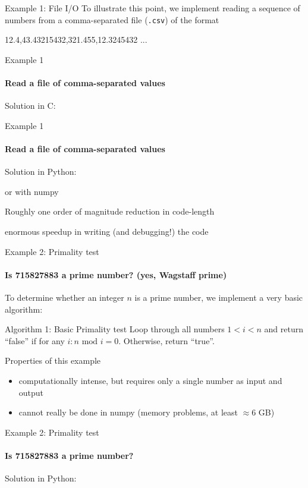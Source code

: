 \documentclass[german]{beamer}
\newcommand{\ra}{\text{$\rightarrow$}}
\begin{document}
\begin{frame}[fragile]{Example 1: File I/O}
  To illustrate this point, we implement reading a sequence of numbers
  from a comma-separated file ({\tt .csv}) of the format
  \begin{semiverbatim}
    12.4,43.43215432,321.455,12.3245432 ...
  \end{semiverbatim}
\end{frame}
\begin{frame}[fragile]{Example 1}
  \framesubtitle{Read a file of comma-separated values}

  Solution in C:
  

\end{frame}

\begin{frame}[fragile]{Example 1}
  \framesubtitle{Read a file of comma-separated values}

  Solution in Python:
  

  or with numpy
  

\ra Roughly one order of magnitude reduction in code-length

\ra enormous speedup in writing (and debugging!) the code 
\end{frame}

\begin{frame}{Example 2: Primality test}
  \framesubtitle{Is 715827883 a prime number? (yes, Wagstaff prime)}
  
  To determine whether an integer $n$ is a prime number, we implement
  a very basic algorithm:
  \begin{block}{Algorithm 1: Basic Primality test}
    Loop through all numbers $1<i<n$ and return ``false'' if 
    for any $i: n\text{ mod }i=0$. Otherwise, return ``true''.
  \end{block}
  
  \begin{block}{Properties of this example}
    \begin{itemize}
    \item computationally intense, but requires only a single number
      as input and output
    \item cannot really be done in numpy (memory problems, at least
      $\approx 6$ GB)
    \end{itemize}
  \end{block}

\end{frame}
\begin{frame}[fragile]{Example 2: Primality test}
  \framesubtitle{Is 715827883 a prime number?}

  Solution in Python:
  
\end{frame}
\end{document}
